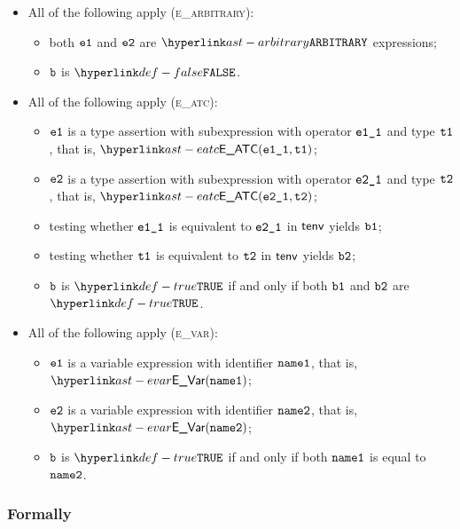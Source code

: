 \begin{itemize}
  \item All of the following apply (\textsc{e\_arbitrary}):
  \begin{itemize}
    \item both $\veone$ and $\vetwo$ are $\ARBITRARY$ expressions;
    \item $\vb$ is $\False$.
  \end{itemize}

  \item All of the following apply (\textsc{e\_atc}):
  \begin{itemize}
    \item $\veone$ is a type assertion with subexpression with operator $\veoneone$ and type $\vtone$,
          that is, $\EATC(\veoneone, \vtone)$;
    \item $\vetwo$ is a type assertion with subexpression with operator $\vetwoone$ and type $\vttwo$,
          that is, $\EATC(\vetwoone, \vttwo)$;
    \item testing whether $\veoneone$ is equivalent to $\vetwoone$ in $\tenv$ yields $\vbone$;
    \item testing whether $\vtone$ is equivalent to $\vttwo$ in $\tenv$ yields $\vbtwo$;
    \item $\vb$ is $\True$ if and only if both $\vbone$ and $\vbtwo$ are $\True$.
  \end{itemize}

  \item All of the following apply (\textsc{e\_var}):
  \begin{itemize}
    \item $\veone$ is a variable expression with identifier $\nameone$, that is, $\EVar(\nameone)$;
    \item $\vetwo$ is a variable expression with identifier $\nametwo$, that is, $\EVar(\nametwo)$;
    \item $\vb$ is $\True$ if and only if both $\nameone$ is equal to $\nametwo$.
  \end{itemize}
\end{itemize}

\subsubsection{Formally}
\begin{mathpar}
\end{mathpar}

